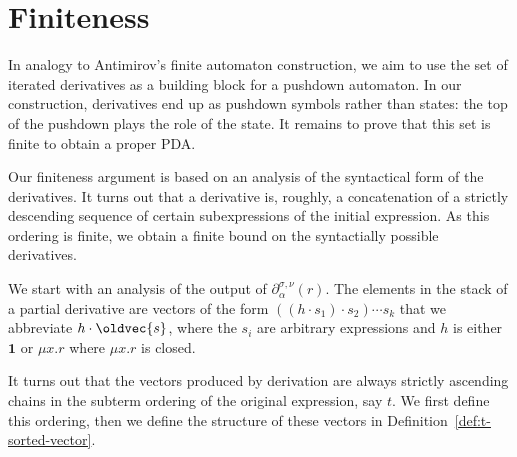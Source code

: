 \documentclass[runningheads, envcountsame, a4paper]{llncs}
\let\vec\oldvec
\newcommand\pderiv[3][{}]{\partial^{#1}_{#3}(#2)}
\newcommand\Rempty{\mathbf1}
\begin{document}
\section{Finiteness}

In analogy to Antimirov's finite automaton construction, we aim to use
the set of iterated derivatives as a building block for a pushdown
automaton. In our construction, derivatives end up as pushdown symbols
rather than states: the top of the pushdown plays the role of the state.
It remains to prove that this set is finite to obtain a proper PDA.

Our finiteness argument is based on an analysis of the syntactical
form of the derivatives. It turns out that a derivative is, roughly, a
concatenation of a strictly descending sequence of certain subexpressions of
the initial expression. As this ordering is finite, we obtain a finite
bound on the syntactially possible derivatives.

We start with an analysis of the output of $\pderiv[\sigma,\nu]r\alpha$.
The elements in the stack of a partial derivative are vectors of the form $((h\cdot s_1)\cdot s_2)\cdots s_k$ that 
we abbreviate $h\cdot\vec{s}$, where the $s_i$ are
arbitrary expressions and $h$ is either $\Rempty$ or ${\mu x.r}$
where $\mu x.r$ is closed. 

It turns out that the vectors produced by derivation are always
strictly ascending chains in the subterm ordering of the original
expression, say $t$. We first define this ordering, then we define the
structure of these vectors in Definition~\ref{def:t-sorted-vector}.
\end{document}
